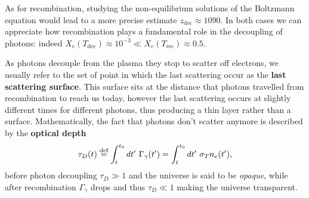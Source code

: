 As for recombination, studying the non-equilibrium solutions of the Boltzmann equation would lead to a more precise estimate $z_\text{dec}\approx 1090$. In both cases we can appreciate how recombination plays a fundamental role in the decoupling of photons: indeed $X_e(T_\text{dec})\approx10^{-3}\ll X_e(T_\text{rec})\approx 0.5$.

As photons decouple from the plasma they stop to scatter off electrons, we usually refer to the set of point in which the last scattering occur as the \textbf{last scattering surface}. This surface sits at the distance that photons travelled from recombination to reach us today, however the last scattering occurs at slightly different times for different photons, thus producing a thin layer rather than a surface. Mathematically, the fact that photons don't scatter anymore is described by the \textbf{optical depth}
\begin{equation}
    \tau_D(t)\defeq \int_{t}^{t_0}dt'\ \Gamma_\gamma(t')=\int_{t}^{t_0}dt'\ \sigma_T n_e(t'),\label{eq:optical_depth}
\end{equation} 
before photon decoupling $\tau_D\gg1$ and the universe is said to be \emph{opaque}, while after recombination $\Gamma_\gamma$ drops and thus $ \tau_D\ll1$ making the universe transparent.

